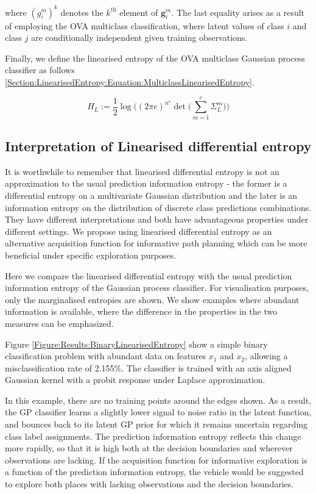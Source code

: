 \documentclass{article}
\renewcommand{\vec}[1]{\boldsymbol{#1}}
\begin{document}
			where $(g^{m}_{i})^{k}$ denotes the $k^{\text{th}}$ element of $\vec{g}^{m}_{i}$. The last equality arises as a result of employing the OVA multiclass classification, where latent values of class $i$ and class $j$ are conditionally independent given training observations.
			
			Finally, we define the linearised entropy of the OVA multiclass Gaussian process classifier as follows \eqref{Section:LinearisedEntropy:Equation:MulticlassLinearisedEntropy}.
			
			\begin{equation}
				H_{L} := \frac{1}{2} \log\Bigg((2 \pi e)^{n^{\star}} \det\bigg(\sum_{m = 1}^{c} \Sigma^{m}_{L}\bigg)\Bigg)
			\label{Section:LinearisedEntropy:Equation:MulticlassLinearisedEntropy}
			\end{equation}			
	
	\subsection{Interpretation of Linearised differential entropy}
	
		It is worthwhile to remember that linearised differential entropy is not an approximation to the usual prediction information entropy - the former is a differential entropy on a multivariate Gaussian distribution and the later is an information entropy on the distribution of discrete class predictions combinations. They have different interpretations and both have advantageous properties under different settings. We propose using linearised differential entropy as an alternative acquisition function for informative path planning which can be more beneficial under specific exploration purposes.
		
		Here we compare the linearised differential entropy with the usual prediction information entropy of the Gaussian process classifier. For visualisation purposes, only the marginalised entropies are shown. We show examples where abundant information is available, where the difference in the properties in the two measures can be emphasized. 
		
		Figure \ref{Figure:Results:BinaryLinearisedEntropy} show a simple binary classification problem with abundant data on features $x_{1}$ and $x_{2}$, allowing a misclassification rate of 2.155\%. The classifier is trained with an axis aligned Gaussian kernel with a probit response under Laplace approximation. 

		In this example, there are no training points around the edges shown. As a result, the GP classifier learns a slightly lower signal to noise ratio in the latent function, and bounces back to its latent GP prior for which it remains uncertain regarding class label assignments. The prediction information entropy reflects this change more rapidly, so that it is high both at the decision boundaries and wherever observations are lacking. If the acquisition function for informative exploration is a function of the prediction information entropy, the vehicle would be suggested to explore both places with lacking observations and the decision boundaries. 
		
\end{document}
